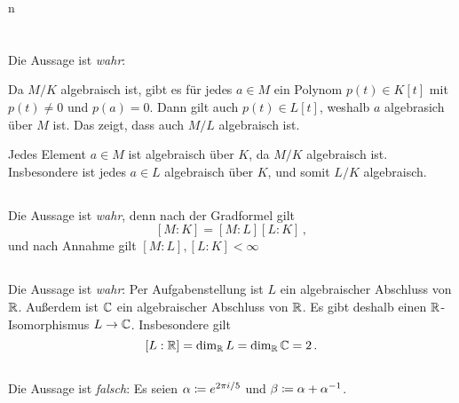 n\section{}





\subsection{}

Die Aussage ist \emph{wahr}:

Da $M/K$ algebraisch ist, gibt es für jedes $a \in M$ ein Polynom $p(t) \in K[t]$ mit $p(t) \neq 0$ und $p(a) = 0$.
Dann gilt auch $p(t) \in L[t]$, weshalb $a$ algebrasich über $M$ ist.
Das zeigt, dass auch $M/L$ algebraisch ist.

Jedes Element $a \in M$ ist algebraisch über $K$, da $M/K$ algebraisch ist.
Insbesondere ist jedes $a \in L$ algebraisch über $K$, und somit $L/K$ algebraisch.





\subsection{}

Die Aussage ist \emph{wahr}, denn nach der Gradformel gilt
\[
    [M : K]
  = [M : L][L : K] \,,
\]
und nach Annahme gilt $[M : L], [L : K] < \infty$





\subsection{}

Die Aussage ist \emph{wahr}:
Per Aufgabenstellung ist $L$ ein algebraischer Abschluss von $\mathbb{R}$.
Außerdem ist $\mathbb{C}$ ein algebraischer Abschluss von $\mathbb{R}$.
Es gibt deshalb einen $\mathbb{R}$-Isomorphismus $L \to \mathbb{C}$.
Insbesondere gilt
\[
    [L : \mathbb{R}]
  = \dim_{\mathbb{R}} L
  = \dim_{\mathbb{R}} \mathbb{C}
  = 2 \,.
\]





\subsection{}

Die Aussage ist \emph{falsch}:
Es seien $\alpha \coloneqq e^{2 \pi i / 5}$ und $\beta \coloneqq \alpha + \alpha^{-1}$.

